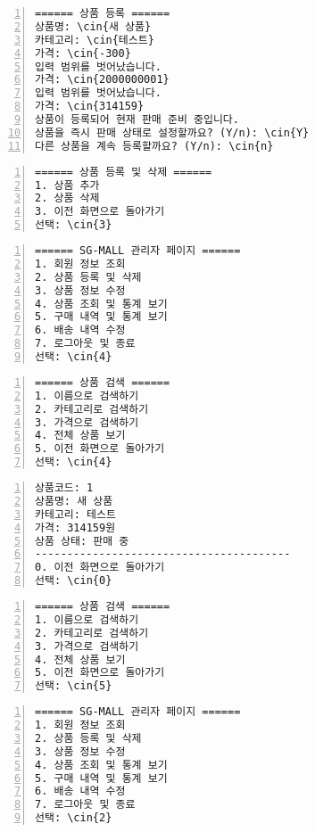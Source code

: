 \documentclass[runningheads]{llncs}
\newcommand{\cin}[1]{\textbf{\textcolor{orange}{#1}}}
\begin{document}
\begin{Verbatim}[frame=single,numbers=left,commandchars=\\\{\}]
====== 상품 등록 ======
상품명: \cin{새 상품}
카테고리: \cin{테스트}
가격: \cin{-300}
입력 범위를 벗어났습니다.
가격: \cin{2000000001}
입력 범위를 벗어났습니다.
가격: \cin{314159}
상품이 등록되어 현재 판매 준비 중입니다.
상품을 즉시 판매 상태로 설정할까요? (Y/n): \cin{Y}
다른 상품을 계속 등록할까요? (Y/n): \cin{n}
\end{Verbatim}

\begin{Verbatim}[frame=single,numbers=left,commandchars=\\\{\}]
====== 상품 등록 및 삭제 ======
1. 상품 추가
2. 상품 삭제
3. 이전 화면으로 돌아가기
선택: \cin{3}
\end{Verbatim}

\begin{Verbatim}[frame=single,numbers=left,commandchars=\\\{\}]
====== SG-MALL 관리자 페이지 ======
1. 회원 정보 조회
2. 상품 등록 및 삭제
3. 상품 정보 수정
4. 상품 조회 및 통계 보기
5. 구매 내역 및 통계 보기
6. 배송 내역 수정
7. 로그아웃 및 종료
선택: \cin{4}
\end{Verbatim}

\begin{Verbatim}[frame=single,numbers=left,commandchars=\\\{\}]
====== 상품 검색 ======
1. 이름으로 검색하기
2. 카테고리로 검색하기
3. 가격으로 검색하기
4. 전체 상품 보기
5. 이전 화면으로 돌아가기
선택: \cin{4}
\end{Verbatim}

\begin{Verbatim}[frame=single,numbers=left,commandchars=\\\{\}]
상품코드: 1
상품명: 새 상품
카테고리: 테스트
가격: 314159원
상품 상태: 판매 중
----------------------------------------
0. 이전 화면으로 돌아가기
선택: \cin{0}
\end{Verbatim}

\begin{Verbatim}[frame=single,numbers=left,commandchars=\\\{\}]
====== 상품 검색 ======
1. 이름으로 검색하기
2. 카테고리로 검색하기
3. 가격으로 검색하기
4. 전체 상품 보기
5. 이전 화면으로 돌아가기
선택: \cin{5}
\end{Verbatim}

\begin{Verbatim}[frame=single,numbers=left,commandchars=\\\{\}]
====== SG-MALL 관리자 페이지 ======
1. 회원 정보 조회
2. 상품 등록 및 삭제
3. 상품 정보 수정
4. 상품 조회 및 통계 보기
5. 구매 내역 및 통계 보기
6. 배송 내역 수정
7. 로그아웃 및 종료
선택: \cin{2}
\end{Verbatim}
\end{document}
